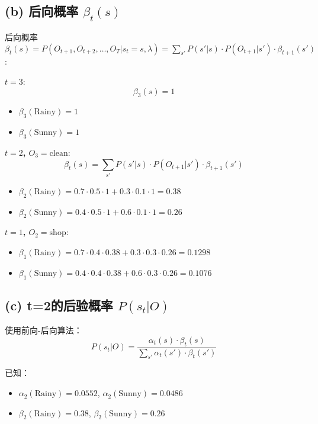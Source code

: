 \documentclass{article}
\begin{document}
\subsection*{(b) 后向概率 \(\beta_t(s)\)}

后向概率 \(\beta_t(s) = P(O_{t+1}, O_{t+2}, \dots, O_T | s_t = s, \lambda)=\sum_{s'} P(s' | s) \cdot P(O_{t+1} | s') \cdot \beta_{t+1}(s')
\):

\textbf{\( t=3 \)}: 
\[
\beta_3(s) = 1
\]
\begin{itemize}
    \item \(\beta_3(\text{Rainy}) = 1\)
    \item \(\beta_3(\text{Sunny}) = 1\)
\end{itemize}

\textbf{\( t=2 \), \( O_3 = \text{clean} \)}: 
\[
\beta_t(s) = \sum_{s'} P(s' | s) \cdot P(O_{t+1} | s') \cdot \beta_{t+1}(s')
\]
\begin{itemize}
    \item \(\beta_2(\text{Rainy}) = 0.7 \cdot 0.5 \cdot 1 + 0.3 \cdot 0.1 \cdot 1 = 0.38\)
    \item \(\beta_2(\text{Sunny}) = 0.4 \cdot 0.5 \cdot 1 + 0.6 \cdot 0.1 \cdot 1 = 0.26\)
\end{itemize}

\textbf{\( t=1 \), \( O_2 = \text{shop} \)}: 
\begin{itemize}
    \item \(\beta_1(\text{Rainy}) = 0.7 \cdot 0.4 \cdot 0.38 + 0.3 \cdot 0.3 \cdot 0.26 = 0.1298\)
    \item \(\beta_1(\text{Sunny}) = 0.4 \cdot 0.4 \cdot 0.38 + 0.6 \cdot 0.3 \cdot 0.26 = 0.1076\)
\end{itemize}

\subsection*{(c) t=2的后验概率 \(P(s_t|O)\)}

使用前向-后向算法：
\[
P(s_t | O) = \frac{\alpha_t(s) \cdot \beta_t(s)}{\sum_{s'} \alpha_t(s') \cdot \beta_t(s')}
\]

已知：
\begin{itemize}
    \item \(\alpha_2(\text{Rainy}) = 0.0552\), \(\alpha_2(\text{Sunny}) = 0.0486\)
    \item \(\beta_2(\text{Rainy}) = 0.38\), \(\beta_2(\text{Sunny}) = 0.26\)
\end{itemize}
\end{document}
